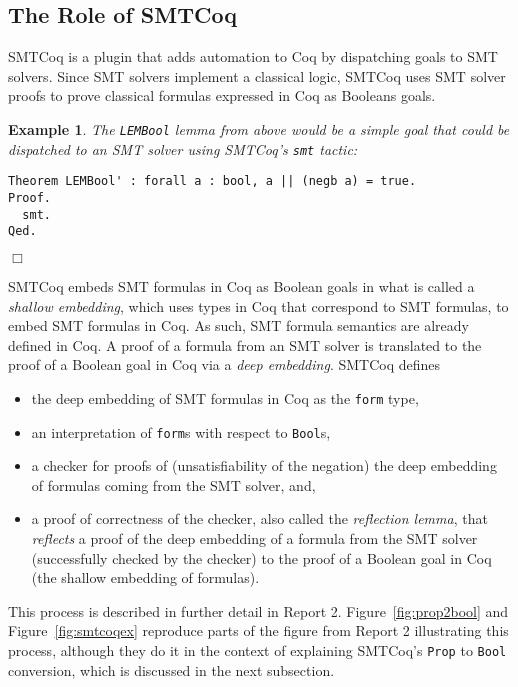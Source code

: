 \documentclass[11pt]{article}
\newtheorem{example}{Example}[section]
\begin{document}
	\subsection{The Role of SMTCoq}
	SMTCoq is a plugin that adds automation
	to Coq by dispatching goals to SMT
	solvers. Since SMT solvers implement 
	a classical logic, SMTCoq 
	uses SMT solver proofs to 
	prove classical formulas 
	expressed in Coq as Booleans
	goals. 
	
	\begin{example}
		\em The \texttt{LEMBool} lemma from 
		above would be a simple goal that 
		could be dispatched to an SMT 
		solver using SMTCoq's \texttt{smt}
		tactic:
		\begin{verbatim}
Theorem LEMBool' : forall a : bool, a || (negb a) = true.
Proof.
  smt.
Qed.
		\end{verbatim}
		\hfill$\Box$
	\end{example}
	SMTCoq embeds SMT formulas in 
	Coq as Boolean goals in what is 
	called a \textit{shallow embedding}, 
	which uses 
	types in Coq that correspond to SMT
	formulas, to embed SMT formulas
	in Coq. As such, SMT formula semantics 
	are already defined in Coq. A proof of a
	formula from an SMT solver is 
	translated to the proof of a Boolean
	goal in Coq via a \textit{deep embedding}.
	SMTCoq defines 
	\begin{itemize}
		\item the deep embedding of
			SMT formulas in Coq as the 
			\texttt{form} type, 
		\item an interpretation of 
			\texttt{form}s with respect to 
			\texttt{Bool}s,
		\item a checker for proofs of 
			(unsatisfiability of the 
			negation) the deep embedding 
			of formulas coming from the SMT 
			solver, and,
		\item a proof of correctness of 
			the checker, also called 
			the \textit{reflection lemma},
			that \textit{reflects} a proof
			of the deep embedding of a 
			formula from the SMT solver
			(successfully checked by the 
			checker) to the proof of a 
			Boolean goal in Coq (the 
			shallow embedding of 
			formulas).
	\end{itemize}
	This process is described in further
	detail in Report 2. 
	Figure~\ref{fig:prop2bool} and
	Figure~\ref{fig:smtcoqex} reproduce
	parts of the figure from 
	Report 2 illustrating this process, 
	although they do it in the context 
	of explaining SMTCoq's 
	\texttt{Prop} to \texttt{Bool}
	conversion, which is discussed in the
	next subsection.
	
\end{document}
